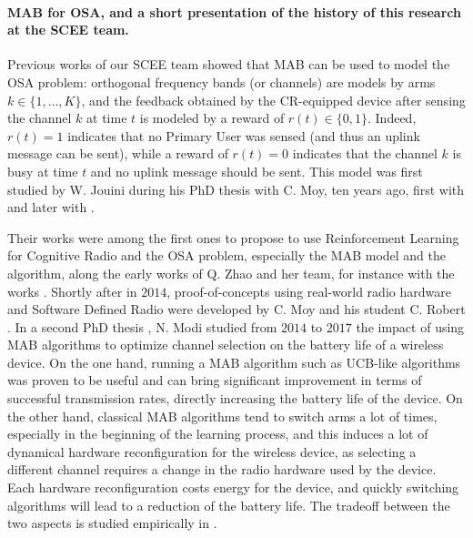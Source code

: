 \paragraph{MAB for OSA, and a short presentation of the history of this research at the SCEE team.}
%
Previous works of our SCEE team showed that MAB can be used to model the OSA problem:
orthogonal frequency bands (or channels) are models by arms $k\in\{1,\dots,K\}$,
and the feedback obtained by the CR-equipped device after sensing the channel $k$ at time $t$ is modeled by a reward of $r(t) \in \{0,1\}$.
Indeed, $r(t) = 1$ indicates that no Primary User was sensed (and thus an uplink message can be sent), while a reward of $r(t)=0$ indicates that the channel $k$ is busy at time $t$ and no uplink message should be sent.
%
This model was first studied by W. Jouini during his PhD thesis with C. Moy, ten years ago, first with \cite{Jouini09} and later with \cite{Jouini10,Jouini12}.

Their works were among the first ones to propose to use Reinforcement Learning for Cognitive Radio and the OSA problem, especially the MAB model and the \UCB{} algorithm,
along the early works of Q. Zhao and her team, for instance with the works \cite{Liu08,Zhao10}.
%
Shortly after in $2014$, proof-of-concepts using real-world radio hardware and Software Defined Radio were developed by C. Moy and his student C. Robert \cite{RobertSDR2014,MoyWSR2014}.
In a second PhD thesis \cite{Modi17PhD}, N. Modi studied from $2014$ to $2017$ the impact of using MAB algorithms to optimize channel selection on the battery life of a wireless device.
On the one hand, running a MAB algorithm such as UCB-like algorithms was proven to be useful and can bring significant improvement in terms of successful transmission rates, directly increasing the battery life of the device.
On the other hand, classical MAB algorithms tend to switch arms a lot of times, especially in the beginning of the learning process, and this induces a lot of dynamical hardware reconfiguration for the wireless device, as selecting a different channel requires a change in the radio hardware used by the device.
Each hardware reconfiguration costs energy for the device, and quickly switching algorithms will lead to a reduction of the battery life.
The tradeoff between the two aspects is studied empirically in
\cite{modiDemo2016}.

